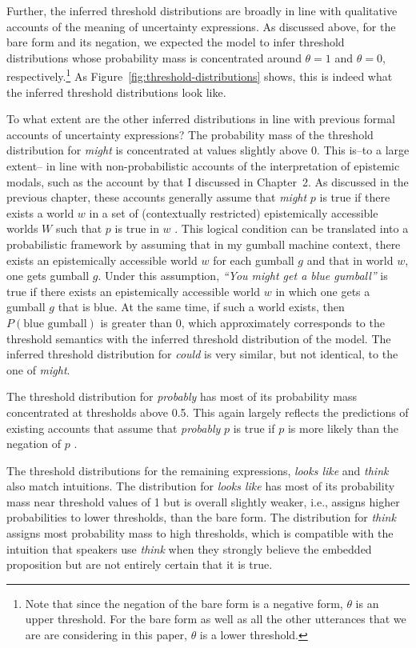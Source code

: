 Further, the inferred threshold distributions are broadly in line with qualitative accounts of the meaning of uncertainty expressions.
As discussed above, for the bare form and its negation, we expected the model to infer threshold distributions whose probability mass is concentrated 
around $\theta=1$ and $\theta=0$, respectively.\footnote{Note that since the negation of the bare form is a negative form, $\theta$ is an upper threshold. For the bare form as well as
all the other utterances that we are are considering in this paper, $\theta$ is a lower threshold.} As  Figure~\ref{fig:threshold-distributions} shows, this is indeed what
the inferred threshold distributions look like. 

To what extent are the other inferred distributions in line with previous formal accounts of uncertainty expressions? 
The probability mass of the threshold distribution for \textit{might} is  concentrated at values slightly above 0. This
is--to a large extent-- in line with non-probabilistic accounts of the interpretation of epistemic modals, such as the account
by \cite{Kratzer2012} that I discussed in Chapter~2. As discussed in the previous chapter, these accounts generally assume that \textit{might} $p$ is true 
if there exists a world $w$ in a set of (contextually restricted) epistemically accessible worlds $W$ such that $p$ is true in $w$ 
\parencite[e.g.,][]{Kratzer1991,Swanson2008,Hacquard2011}. This logical condition can be translated into a probabilistic framework by assuming that 
in my gumball machine context, there exists an epistemically accessible world $w$ for each gumball $g$ and that in world $w$, one gets gumball $g$. 
Under this assumption, \textit{``You might get a blue gumball''} is true if there exists an epistemically accessible world $w$  in which one gets a
gumball $g$ that is blue. At the same time, if such a world exists, then $P(\mbox{blue gumball})$ is greater than 0, which approximately corresponds
to the threshold semantics with the inferred threshold distribution of the model. The inferred threshold distribution for \textit{could} is very similar, 
but not identical, to the one of \textit{might}.

The threshold distribution for \textit{probably} has most of its probability mass concentrated at thresholds above 0.5. This again largely reflects the predictions of 
existing accounts that assume that \textit{probably} $p$ is true if $p$ is more likely than the negation of $p$ .

The threshold distributions for the remaining expressions, \textit{looks like} and \textit{think} also match intuitions. The distribution for 
\textit{looks like} has most of its probability mass near threshold values of 1 but is overall slightly weaker, i.e., assigns higher probabilities to lower thresholds,
than the bare form. The distribution for \textit{think} assigns most probability mass to high thresholds, which is compatible with the intuition
that speakers use \textit{think} when they strongly believe the embedded proposition but are not entirely certain that it is true.

